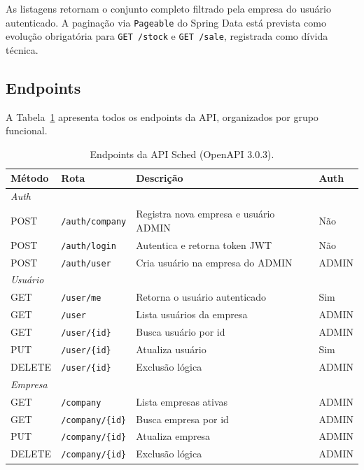\documentclass[12pt,a4paper]{article}
\begin{document}
As listagens retornam o conjunto completo filtrado pela empresa do usuário autenticado. A paginação via \texttt{Pageable} do Spring Data está prevista como evolução obrigatória para \texttt{GET /stock} e \texttt{GET /sale}, registrada como dívida técnica.

\subsection{Endpoints}

A Tabela~\ref{tab:endpoints} apresenta todos os endpoints da API, organizados por grupo funcional.

\begin{table}[H]
\centering
\caption{Endpoints da API Sched (OpenAPI 3.0.3).}
\label{tab:endpoints}
\vspace{0.2cm}
\small
\begin{tabular}{llp{5.2cm}l}
\toprule
\textbf{Método} & \textbf{Rota} & \textbf{Descrição} & \textbf{Auth} \\
\midrule
\multicolumn{4}{l}{\textit{Auth}} \\
POST & \texttt{/auth/company} & Registra nova empresa e usuário ADMIN & Não \\
POST & \texttt{/auth/login}   & Autentica e retorna token JWT & Não \\
POST & \texttt{/auth/user}    & Cria usuário na empresa do ADMIN & ADMIN \\
\midrule
\multicolumn{4}{l}{\textit{Usuário}} \\
GET  & \texttt{/user/me}      & Retorna o usuário autenticado & Sim \\
GET  & \texttt{/user}         & Lista usuários da empresa & ADMIN \\
GET  & \texttt{/user/\{id\}}  & Busca usuário por id & ADMIN \\
PUT  & \texttt{/user/\{id\}}  & Atualiza usuário & Sim \\
DELETE & \texttt{/user/\{id\}} & Exclusão lógica & ADMIN \\
\midrule
\multicolumn{4}{l}{\textit{Empresa}} \\
GET  & \texttt{/company}       & Lista empresas ativas & ADMIN \\
GET  & \texttt{/company/\{id\}} & Busca empresa por id & ADMIN \\
PUT  & \texttt{/company/\{id\}} & Atualiza empresa & ADMIN \\
DELETE & \texttt{/company/\{id\}} & Exclusão lógica & ADMIN \\

\end{tabular}
\end{table}
\end{document}
